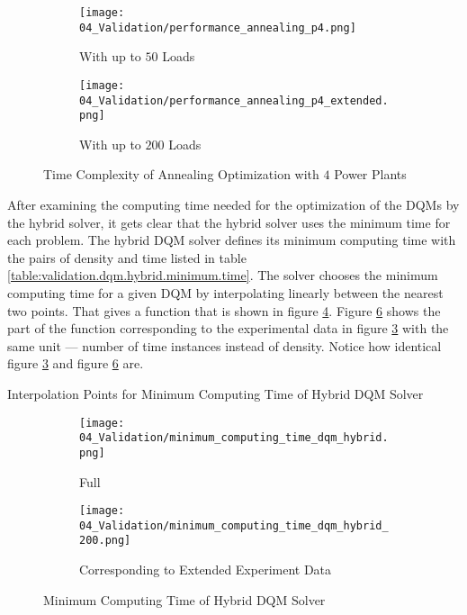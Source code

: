 \begin{figure}
  \begin{subfigure}[b]{0.5 \textwidth}
    \centering
    \texttt{[image: 04\_Validation/performance\_annealing\_p4.png]}
    \caption{With up to $50$ Loads}
    \label{figure:validation.annealing.performance}
  \end{subfigure}
  \begin{subfigure}[b]{0.5 \textwidth}
    \centering
    \texttt{[image: 04\_Validation/performance\_annealing\_p4\_extended.png]}
    \caption{With up to $200$ Loads}
    \label{figure:validation.annealing.performance.extended}
  \end{subfigure}
  \caption{Time Complexity of Annealing Optimization with $4$ Power Plants}
\end{figure}

After examining the computing time needed for the optimization of the DQMs by the hybrid solver, it gets clear that the hybrid solver uses the minimum time for each problem.
The hybrid DQM solver defines its minimum computing time with the pairs of density and time listed in table \ref{table:validation.dqm.hybrid.minimum.time}.
The solver chooses the minimum computing time for a given DQM by interpolating linearly between the nearest two points.
That gives a function that is shown in figure \ref{figure:validation.dqm.hybrid.minimum.time}.
Figure \ref{figure:validation.dqm.hybrid.minimum.time.200} shows the part of the function corresponding to the experimental data in figure \ref{figure:validation.annealing.performance.extended} with the same unit
--- number of time instances instead of density.
Notice how identical figure \ref{figure:validation.annealing.performance.extended} and figure \ref{figure:validation.dqm.hybrid.minimum.time.200} are.
\begin{table}[ht]
  \centering
  
  \caption{Interpolation Points for Minimum Computing Time of Hybrid DQM Solver}
  \label{table:validation.dqm.hybrid.minimum.time}
\end{table}
\begin{figure} [ht]
  \begin{subfigure}[b]{0.5 \textwidth}
    \centering
    \texttt{[image: 04\_Validation/minimum\_computing\_time\_dqm\_hybrid.png]}
    \caption{Full}
    \label{figure:validation.dqm.hybrid.minimum.time}
  \end{subfigure}
  \begin{subfigure}[b]{0.5 \textwidth}
    \centering
    \texttt{[image: 04\_Validation/minimum\_computing\_time\_dqm\_hybrid\_200.png]}
    \caption{Corresponding to Extended Experiment Data}
    \label{figure:validation.dqm.hybrid.minimum.time.200}
  \end{subfigure}
  \caption{Minimum Computing Time of Hybrid DQM Solver}
\end{figure}

